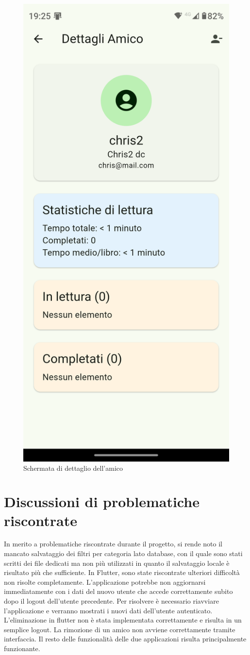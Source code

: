 \documentclass{article}
\begin{document}
\begin{figure}[H]
  \centering
  \includegraphics[width=0.6\linewidth]{friend-screen-f.png}
  \caption{Schermata di dettaglio dell'amico}
  \label{fig:sitemap}
\end{figure}

\section{Discussioni di problematiche riscontrate}
In merito a problematiche riscontrate durante il progetto, si rende noto il mancato salvataggio dei filtri per categoria lato database, con il quale sono stati scritti dei file dedicati ma non più utilizzati
in quanto il salvataggio locale è risultato più che sufficiente. In Flutter, sono state riscontrate ulteriori difficoltà non risolte completamente. L'applicazione potrebbe non aggiornarsi immediatamente con i dati del nuovo utente che accede correttamente subito dopo il logout dell'utente precedente.
Per risolvere è necessario riavviare l'applicazione e verranno mostrati i nuovi dati dell'utente autenticato. L'eliminazione in flutter non è stata implementata correttamente e risulta in un semplice logout.
La rimozione di un amico non avviene correttamente tramite interfaccia. Il resto delle funzionalità delle due applicazioni risulta principalmente funzionante.
\end{document}
